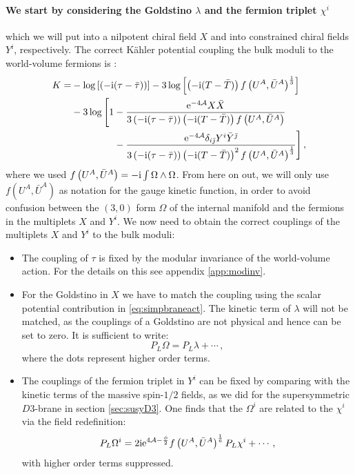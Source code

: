 \documentclass[12pt]{report}
\newcommand{\be}{\begin{equation}}
\newcommand{\ee}{\end{equation}}
\newcommand{\bea}{\begin{equation}\begin{aligned}}
\newcommand{\eea}{\end{aligned}\end{equation}}
\def\rmi{{\rm i}}
\def\rme{{\rm e}}
\def\jb{{\bar \jmath}}
\begin{document}
\paragraph{We start by considering the Goldstino $\lambda$ and the fermion triplet $\chi^i$} which we will put into a nilpotent chiral field $X$ and into constrained chiral fields $Y^i$, respectively. The correct Kähler potential coupling the bulk moduli to the world-volume fermions is \cite{GarciadelMoral:2017vnz}:
\bea 
K = &- \log\left[\left(-\rmi(\tau-\bar{\tau})\right)\right] - 3 \log\left[\left(-\rmi(T-\bar{T})\right)f\left(U^A,\bar{U}^A\right)^{\frac{1}{3}}\right]\\
&- 3\log \Bigg[ 1- \frac{\rme^{-4\mathcal{A}} X\bar{X}}{3\left(-\rmi (\tau-\bar{\tau})\right)\left(-\rmi(T-\bar{T})\right)f\left(U^A,\bar{U}^A\right)}\\
&\qquad \qquad \;\,  - \frac{\rme^{-4\mathcal{A}}\delta_{i\jb}Y^i \bar{Y}^\jb}{3\left(-\rmi (\tau-\bar{\tau})\right)\left(-\rmi(T-\bar{T})\right)^2 f\left(U^A,\bar{U}^A\right)^{\frac{1}{3}}}\Bigg]\,,
\eea
where we used $f\left(U^A,\bar{U}^A\right) = -\rmi \int \Omega \wedge \Omega$. From here on out, we will only use $f\left(U^A,\bar{U}^A\right)$ as notation for the gauge kinetic function, in order to avoid confusion between the $(3,0)$ form $\Omega$ of the internal manifold and the fermions in the multiplets $X$ and $Y^i$. We now need to obtain the correct couplings of the multiplets $X$ and $Y^i$ to the bulk moduli:
\begin{itemize}
\item The coupling of $\tau$ is fixed by the modular invariance of the world-volume action. For the details on this see appendix \ref{app:modinv}.
\item For the Goldstino in $X$ we have to match the coupling using the scalar potential contribution in \eqref{eq:simpbraneact}. The kinetic term of $\lambda$ will not be matched, as the couplings of a Goldstino are not physical and hence can be set to zero. It is sufficient to write:
\be 
P_L \Omega = P_L \lambda + \cdots\,,
\ee
where the dots represent higher order terms.
\item The couplings of the fermion triplet in $Y^i$ can be fixed by comparing with the kinetic terms of the massive spin-$1/2$ fields, as we did for the supersymmetric $D3$-brane in section \ref{sec:susyD3}. One finds that the $\Omega^i$ are related to the $\chi^i$ via the field redefinition:
\be 
P_L \Omega^i = 2 \rmi \rme^{4\mathcal{A}-\frac{\phi}{2}} f\left(U^A ,\bar{U}^A\right)^{\frac{1}{6}} P_L \chi^i + \cdots\,,
\ee
with higher order terms suppressed.
\end{itemize}
\end{document}
